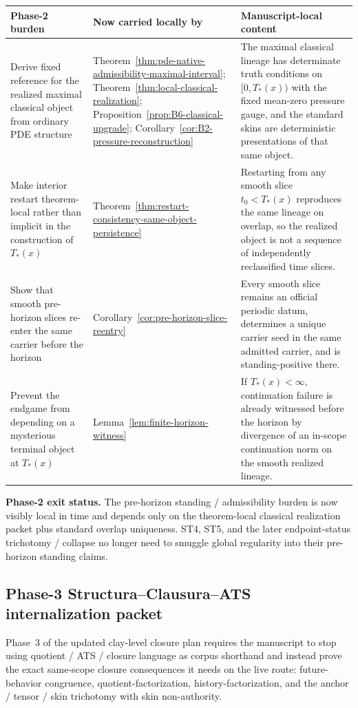 \begin{center}
\footnotesize
\renewcommand{\arraystretch}{1.16}
\setlength{\tabcolsep}{4pt}
\begin{tabularx}{0.98\textwidth}{@{}L{0.31\textwidth}L{0.24\textwidth}Y@{}}
\toprule
\textbf{Phase-2 burden} & \textbf{Now carried locally by} & \textbf{Manuscript-local content}\\
\midrule
Derive fixed reference for the realized maximal classical object from ordinary PDE structure & Theorem~\ref{thm:pde-native-admissibility-maximal-interval}; Theorem~\ref{thm:local-classical-realization}; Proposition~\ref{prop:B6-classical-upgrade}; Corollary~\ref{cor:B2-pressure-reconstruction} & The maximal classical lineage has determinate truth conditions on $[0,T_*(x))$ with the fixed mean-zero pressure gauge, and the standard skins are deterministic presentations of that same object.\\
Make interior restart theorem-local rather than implicit in the construction of $T_*(x)$ & Theorem~\ref{thm:restart-consistency-same-object-persistence} & Restarting from any smooth slice $t_0<T_*(x)$ reproduces the same lineage on overlap, so the realized object is not a sequence of independently reclassified time slices.\\
Show that smooth pre-horizon slices re-enter the same carrier before the horizon & Corollary~\ref{cor:pre-horizon-slice-reentry} & Every smooth slice remains an official periodic datum, determines a unique carrier seed in the same admitted carrier, and is standing-positive there.\\
Prevent the endgame from depending on a mysterious terminal object at $T_*(x)$ & Lemma~\ref{lem:finite-horizon-witness} & If $T_*(x)<\infty$, continuation failure is already witnessed before the horizon by divergence of an in-scope continuation norm on the smooth realized lineage.\\
\bottomrule
\end{tabularx}
\end{center}

\noindent\textbf{Phase-2 exit status.} The pre-horizon standing / admissibility burden is now visibly local in time and depends only on the theorem-local classical realization packet plus standard overlap uniqueness. ST4, ST5, and the later endpoint-status trichotomy / collapse no longer need to smuggle global regularity into their pre-horizon standing claims.

\subsection*{Phase-3 Structura--Clausura--ATS internalization packet}
Phase~3 of the updated clay-level closure plan requires the manuscript to stop using quotient / ATS / closure language as corpus shorthand and instead prove the exact same-scope closure consequences it needs on the live route: future-behavior congruence, quotient-factorization, history-factorization, and the anchor / tensor / skin trichotomy with skin non-authority.


